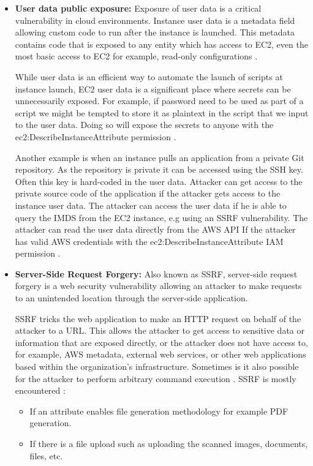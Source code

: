 \begin{itemize}
    \item \textbf{User data public exposure:} Exposure of user data is a critical vulnerability in cloud environments.
    Instance user data is a metadata field allowing custom code to run after the instance is launched.
    This metadata
    contains code that is exposed to any entity which has access to EC2, even the most basic access to EC2 for
    example, read-only configurations \cite{49}.

    While user data is an efficient way to automate the launch of scripts at instance launch, EC2 user data is a
    significant place where secrets can be unnecessarily exposed.
    For example, if password need to be used as part of
    a script we might be tempted to store it as plaintext in the script that we input to the user data.
    Doing so will
    expose the secrets to anyone with the ec2:DescribeInstanceAttribute permission \cite{50}.

    Another example is when an instance pulls an application from a private Git repository.
    As the repository is
    private it can be accessed using the SSH key.
    Often this key is hard-coded in the user data.
    Attacker can get
    access to the private source code of the application if the attacker gets access to the instance user data.
    The attacker can access the user data if he is able to query the IMDS from the EC2 instance, e.g using an SSRF
    vulnerability.
    The attacker can read the user data directly from the AWS API If the attacker has valid AWS
    credentials with the ec2:DescribeInstanceAttribute IAM permission \cite{51}.
\end{itemize}

\begin{itemize}
    \item \textbf{Server-Side Request Forgery:} Also known as SSRF, server-side request forgery is a web security
    vulnerability allowing an attacker to make requests to an unintended location through the server-side application.

    SSRF tricks the web application to make an HTTP request on behalf of the attacker to a URL. This allows the
    attacker to get access to sensitive data or information that are exposed directly, or the attacker does not have
    access to, for example, AWS metadata, external web services, or other web applications based within the
    organization’s infrastructure.
    Sometimes is it also possible for the attacker to perform arbitrary command
    execution \cite{52}.
    SSRF is mostly encountered \cite{53}:
    \begin{itemize}
        \item If an attribute enables file generation methodology for example PDF generation.
    \end{itemize}
    \begin{itemize}
        \item If there is a file upload such as uploading the scanned images, documents, files, etc.
    \end{itemize}
\end{itemize}


